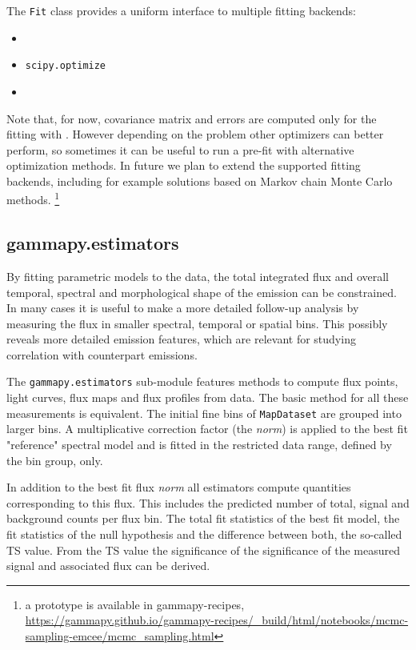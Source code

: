 \documentclass[traditabstract, longauth]{aa}
\newcommand{\code}[1]{\texttt{#1}}
\begin{document}
The \code{Fit} class provides a uniform interface to multiple fitting backends:
\begin{itemize}
	\item \iminuit~\citep{iminuit}
	\item \code{scipy.optimize}~\citep{2020SciPy-NMeth}
	\item \sherpa~\citep{sherpa-2011}
\end{itemize}

Note that, for now, covariance matrix and errors are computed only for the fitting with 
\iminuit. However depending on
the problem other optimizers can better perform, so sometimes it can be useful
to run a pre-fit with alternative optimization methods. In future we plan to
extend the supported fitting backends, including for example solutions based on Markov chain Monte Carlo methods.
\footnote{a prototype is available in gammapy-recipes,
	\url{https://gammapy.github.io/gammapy-recipes/_build/html/notebooks/mcmc-sampling-emcee/mcmc_sampling.html}
}

\subsection{gammapy.estimators}
\label{ssec:gammapy-estimators}
By fitting parametric models to the data, the total integrated
flux and overall temporal, spectral and morphological shape of the
\gammaray emission can be constrained. In many cases it is useful
to make a more detailed follow-up analysis by measuring the
flux in smaller spectral, temporal or spatial bins. This
possibly reveals more detailed emission features, which
are relevant for studying correlation with counterpart emissions.

The \code{gammapy.estimators} sub-module features methods to compute flux
points, light curves, flux maps and flux profiles from data.
The basic method for all these measurements is equivalent.
The initial fine bins of \code{MapDataset} are grouped into
larger bins. A multiplicative correction factor (the \textit{norm})
is applied to the best fit "reference" spectral
model and is fitted in the restricted data range, defined by the 
bin group, only.

In addition to the best fit flux \textit{norm} all estimators compute
quantities corresponding to this flux. This includes
the predicted number of total, signal and background
counts per flux bin. The total fit statistics
of the best fit model, the fit statistics of the
null hypothesis and the difference between both,
the so-called TS value.
From the TS value the significance of the
significance of the measured signal and associated flux
can be derived.
\end{document}
